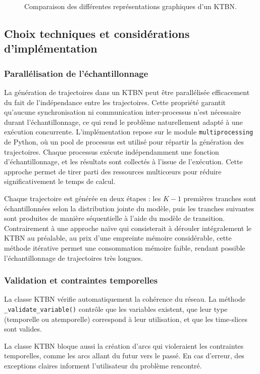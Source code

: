 \documentclass{article}
\begin{document}
\begin{figure}[t]
    \caption{Comparaison des différentes représentations graphiques d'un KTBN.}
    \label{fig:KTBN_notebook}
\end{figure}


\subsection{Choix techniques et considérations d'implémentation}

\subsubsection{Parallélisation de l'échantillonnage}

La génération de trajectoires dans un KTBN peut être parallélisée efficacement du fait de l'indépendance entre
les trajectoires. Cette propriété garantit qu'aucune synchronisation ni communication inter-processus n'est
nécessaire durant l'échantillonnage, ce qui rend le problème naturellement adapté à une exécution concurrente.
L'implémentation repose sur le module \texttt{multiprocessing} de Python, où un pool de processus est utilisé
pour répartir la génération des trajectoires. Chaque processus exécute indépendamment une fonction d'échantillonnage,
et les résultats sont collectés à l'issue de l'exécution. Cette approche permet de tirer parti des ressources
multicœurs pour réduire significativement le temps de calcul.

Chaque trajectoire est générée en deux étapes : les $K-1$ premières tranches sont échantillonnées selon la
distribution jointe du modèle, puis les tranches suivantes sont produites de manière séquentielle à l'aide du
modèle de transition. Contrairement à une approche naïve qui consisterait à dérouler intégralement le KTBN
au préalable, au prix d'une empreinte mémoire considérable, cette méthode itérative permet une consommation
mémoire faible, rendant possible l'échantillonnage de trajectoires très longues.

\subsubsection{Validation et contraintes temporelles}

La classe KTBN vérifie automatiquement la cohérence du réseau. La méthode \texttt{\_validate\_variable()} contrôle
que les variables existent, que leur type (temporelle ou atemporelle) correspond à leur utilisation, et que les
time-slices sont valides.

La classe KTBN bloque aussi la création d'arcs qui violeraient les contraintes temporelles, comme les arcs allant
du futur vers le passé. En cas d'erreur, des exceptions claires informent l'utilisateur du problème rencontré.
\end{document}
